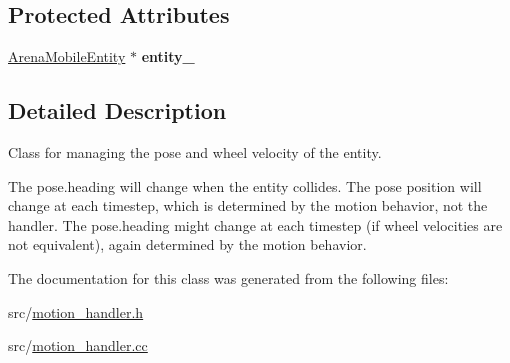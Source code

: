 \subsection*{Protected Attributes}
\begin{DoxyCompactItemize}
\item 
\hyperlink{classArenaMobileEntity}{Arena\+Mobile\+Entity} $\ast$ {\bfseries entity\+\_\+}\hypertarget{classMotionHandler_a659fd1ec8878260a63779bf45681f5a4}{}\label{classMotionHandler_a659fd1ec8878260a63779bf45681f5a4}

\end{DoxyCompactItemize}


\subsection{Detailed Description}
Class for managing the pose and wheel velocity of the entity. 

The pose.\+heading will change when the entity collides. The pose position will change at each timestep, which is determined by the motion behavior, not the handler. The pose.\+heading might change at each timestep (if wheel velocities are not equivalent), again determined by the motion behavior. 

The documentation for this class was generated from the following files\+:\begin{DoxyCompactItemize}
\item 
src/\hyperlink{motion__handler_8h}{motion\+\_\+handler.\+h}\item 
src/\hyperlink{motion__handler_8cc}{motion\+\_\+handler.\+cc}\end{DoxyCompactItemize}
